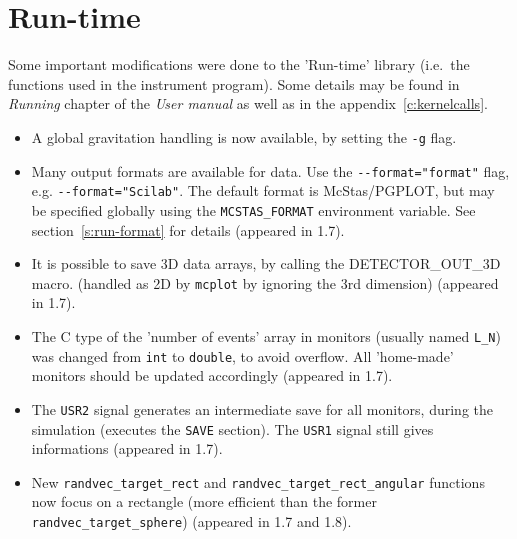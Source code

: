 
\section{Run-time} 
\label{s:new-features:run-time}

Some important modifications were done to the 'Run-time' library 
(i.e.\ the functions used in the instrument program). 
Some details may be found in {\it Running} chapter of the {\it User manual}
as well as in the appendix~\ref{c:kernelcalls}.

\begin{itemize}
\item A global gravitation handling is now available, by setting the \verb+-g+ flag.
\item Many output formats are available for data. Use the
    \verb+--format="format"+ flag, e.g. \verb+--format="Scilab"+.  The default
    format is McStas/PGPLOT, but may be specified globally using the
    \verb+MCSTAS_FORMAT+ environment variable.  See section~\ref{s:run-format}
    for details (appeared in 1.7). 
\item It is possible to save 3D data arrays, by calling the DETECTOR\_OUT\_3D
    macro. (handled as 2D by \verb+mcplot+ by ignoring the 3rd dimension)
    (appeared in 1.7).  
\item The C type of the 'number of events' array in monitors (usually named
    \verb+L_N+) was changed from \verb+int+ to \verb+double+, to avoid overflow.
    All 'home-made' monitors should be updated accordingly (appeared in 1.7).
\item The \verb+USR2+ signal generates an intermediate save for all monitors,
    during the simulation (executes the \texttt{SAVE} section). The \verb+USR1+
    signal still gives informations (appeared in 1.7). 
\item New \verb+randvec_target_rect+ and \verb+randvec_target_rect_angular+
    functions now focus  on a rectangle (more efficient than the former
    \verb+randvec_target_sphere+) (appeared in 1.7 and 1.8).
\end{itemize}


